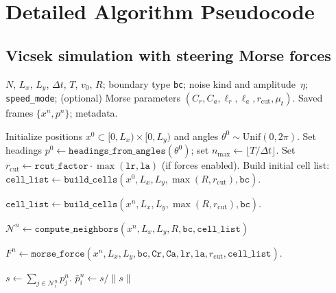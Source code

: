 \chapter{Detailed Algorithm Pseudocode}
\label{app:detailed_algorithms}

\section{Vicsek simulation with steering Morse forces}
\label{sec:app_vicsek}

\begin{breakablealgorithm}
\caption{Discrete-time Vicsek simulation with steering Morse forces}
\label{alg:vicsek}

{\footnotesize
\begin{algorithmic}[1]
\Require $N$, $L_x$, $L_y$, $\Delta t$, $T$, $v_0$, $R$; boundary type \texttt{bc};
noise kind and amplitude~$\eta$; \texttt{speed\_mode};
(optional) Morse parameters $(C_r,C_a,\ell_r,\ell_a,r_{\mathrm{cut}},\mu_t)$.
\Ensure Saved frames $\{x^n,p^n\}$; metadata.

\State Initialize positions $x^0\subset [0,L_x)\times[0,L_y)$ and angles $\theta^0\sim \mathrm{Unif}(0,2\pi)$.
\State Set headings $p^0 \gets \texttt{headings\_from\_angles}(\theta^0)$; set $n_{\max} \gets \lfloor T/\Delta t\rfloor$.
\State Set $r_{\mathrm{cut}} \gets \texttt{rcut\_factor}\cdot \max(\texttt{lr},\texttt{la})$ (if forces enabled).
\State Build initial cell list: $\texttt{cell\_list} \gets \texttt{build\_cells}(x^0,L_x,L_y,\max(R,r_{\mathrm{cut}}),\texttt{bc})$.


    \State $\texttt{cell\_list} \gets \texttt{build\_cells}(x^n,L_x,L_y,\max(R,r_{\mathrm{cut}}),\texttt{bc})$.
  \EndIf

  \State $\mathcal{N}^n \gets \texttt{compute\_neighbors}(x^n,L_x,L_y,R,\texttt{bc},\texttt{cell\_list})$ 

    \State $F^n \gets \texttt{morse\_force}(x^n,L_x,L_y,\texttt{bc},\texttt{Cr},\texttt{Ca},\texttt{lr},\texttt{la},r_{\mathrm{cut}},\texttt{cell\_list})$.
  \EndIf


    \State $s \gets \sum_{j\in\mathcal{N}_i^n} p_j^n$.
    \State $\bar p_i^n \gets s/\|s\|$ 


\end{algorithmic}}
\end{breakablealgorithm}
